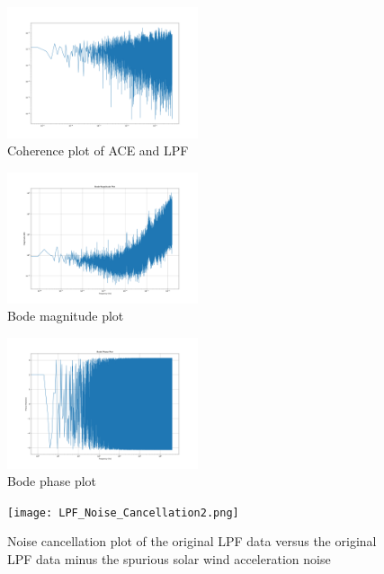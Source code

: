 \documentclass[%
 reprint,
 amsmath,amssymb,
 aps,
]{revtex4-2}
\begin{document}
\begin{figure}[htbp]
\centerline{\includegraphics[width=0.5\textwidth]{ACE_and_LPF_co-1.png}}
\caption{Coherence plot of ACE and LPF}
\label{fig}
\end{figure}

\begin{figure}[htbp]
\centerline{\includegraphics[width=0.5\textwidth]{Bode_Magnitude_Plot-1.png}}
\caption{Bode magnitude plot}
\label{fig}
\end{figure}

\begin{figure}[htbp]
\centerline{\includegraphics[width=0.5\textwidth]{Bode_Phase_Plot-1.png}}
\caption{Bode phase plot}
\label{fig}
\end{figure}

\begin{figure}[htbp]
\centerline{\texttt{[image: LPF\_Noise\_Cancellation2.png]}}
\caption{Noise cancellation plot of the original LPF data versus the original LPF data minus the spurious solar wind acceleration noise}
\label{fig}
\end{figure}
\end{document}

